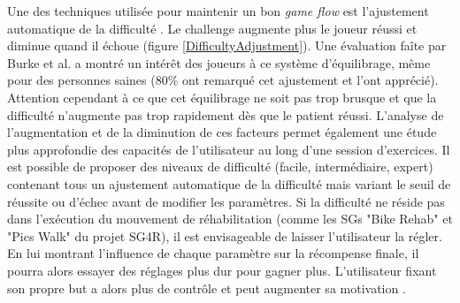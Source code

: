 \begin{itemize}
		Une des techniques utilisée pour maintenir un bon \textit{game flow} est l'ajustement automatique de la difficulté \cite{Alankus_TowardsCustomizableGames, Cameirao_RehabilitationGamingSystem, Burke_DesigningEngagingPlayableGames4Rehab}. Le challenge augmente plus le joueur réussi et diminue quand il échoue (figure \ref{DifficultyAdjustment}). Une évaluation faîte par Burke et al. \cite{Burke_DesigningEngagingPlayableGames4Rehab} a montré un intérêt des joueurs à ce système d'équilibrage, même pour des personnes saines (80\% ont remarqué cet ajustement et l'ont apprécié). Attention cependant à ce que cet équilibrage ne soit pas trop brusque et que la difficulté n'augmente pas trop rapidement dès que le patient réussi. L'analyse de l'augmentation et de la diminution de ces facteurs permet également une étude plus approfondie des capacités de l'utilisateur au long d'une session d'exercices. Il est possible de proposer des niveaux de difficulté (facile, intermédiaire, expert) contenant tous un ajustement automatique de la difficulté mais variant le seuil de réussite ou d'échec avant de modifier les paramètres. Si la difficulté ne réside pas dans l'exécution du mouvement de réhabilitation (comme les SGs "Bike Rehab" et "Pics Walk" du projet SG4R), il est envisageable de laisser l'utilisateur la régler. En lui montrant l'influence de chaque paramètre sur la récompense finale, il pourra alors essayer des réglages plus dur pour gagner plus. L'utilisateur fixant son propre but a alors plus de contrôle et peut augmenter sa motivation \cite{Nagle_DifferentDifficultyAdaptation}.
		
		\begin{minipage}{\linewidth}
			\label{DifficultyAdjustment}
		\end{minipage}\medskip
		

\end{itemize}

